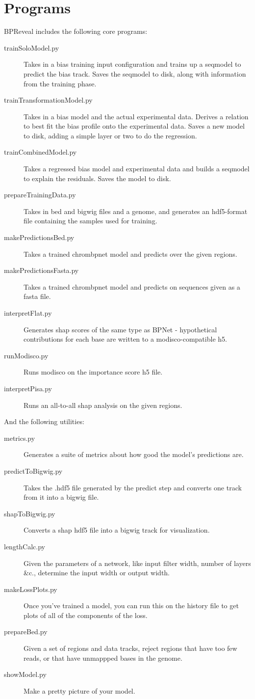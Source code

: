 \documentclass{article}
\begin{document}
\section{Programs}
BPReveal includes the following core programs:
\begin{description}
    \item [trainSoloModel.py] Takes in a bias training input configuration and trains up a seqmodel to predict the bias track. Saves the seqmodel to disk, along with information from the training phase. 
    \item [trainTransformationModel.py] Takes in a bias model and the actual experimental data. Derives a relation to best fit the bias profile onto the experimental data. Saves a new model to disk, adding a simple layer or two to do the regression. 
    \item [trainCombinedModel.py] Takes a regressed bias model and experimental data and builds a seqmodel to explain the residuals. Saves the model to disk.
    \item [prepareTrainingData.py] Takes in bed and bigwig files and a genome, and generates an hdf5-format file containing the samples used for training.  
    \item [makePredictionsBed.py] Takes a trained chrombpnet model and predicts over the given regions. 
    \item [makePredictionsFasta.py] Takes a trained chrombpnet model and predicts on sequences given as a fasta file.
    \item [interpretFlat.py] Generates shap scores of the same type as BPNet - hypothetical contributions for each base are written to a modisco-compatible h5. 
    \item [runModisco.py] Runs modisco on the importance score h5 file.
    \item [interpretPisa.py] Runs an all-to-all shap analysis on the given regions. 
\end{description}

And the following utilities:
\begin{description}
    \item [metrics.py] Generates a suite of metrics about how good the model's predictions are. 
    \item [predictToBigwig.py] Takes the .hdf5 file generated by the predict step and converts one track from it into a bigwig file.
    \item [shapToBigwig.py] Converts a shap hdf5 file into a bigwig track for visualization. 
    \item [lengthCalc.py] Given the parameters of a network, like input filter width, number of layers \&c., determine the input width or output width.
    \item [makeLossPlots.py] Once you've trained a model, you can run this on the history file to get plots of all of the components of the loss. 
    \item [prepareBed.py] Given a set of regions and data tracks, reject regions that have too few reads, or that have unmappped bases in the genome.
    \item [showModel.py] Make a pretty picture of your model.
\end{description}
\end{document}

